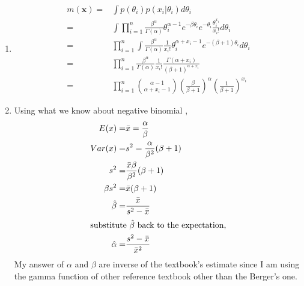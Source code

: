 \documentclass[11pt]{article}
\newcommand{\bnum}{\begin{enumerate}}
\newcommand{\enum}{\end{enumerate}}
\begin{document}
\item %
\bnum
\item %
\begin{align*}
m(\textbf{x}) =& \int p(\theta_i) p(x_i|\theta_i) d\theta_i \\
=& \int \prod_{i=1}^n \frac{\beta^\alpha}{\Gamma(\alpha)} \theta_i^{\alpha-1} e^{-\beta\theta_i} e^{-\theta_i} \frac{\theta_i^{x_i}}{x_i!} d\theta_i \\
=& \prod_{i=1}^n \int \frac{\beta^\alpha}{\Gamma(\alpha)} \frac{1}{x_i!} \theta_i^{\alpha+x_i-1} e^{-(\beta+1)\theta_i} d\theta_i \\
=& \prod_{i=1}^n \frac{\beta^\alpha}{\Gamma(\alpha)} \frac{1}{x_i!} \frac{\Gamma(\alpha+x_i)}{(\beta+1)^{\alpha+x_i}} \\
=& \prod_{i=1}^n {{\alpha-1}\choose{\alpha+x_i-1}}(\frac{\beta}{\beta+1})^\alpha (\frac{1}{\beta+1})^{x_i}
\end{align*}
\item %
 Using what we know about negative binomial ,
\begin{align*}
E(x) =& \bar{x} = \frac{\alpha}{\beta} \\
Var(x) =& s^2 =  \frac{\alpha}{\beta^2}(\beta+1)\\
s^2 =& \frac{\bar{x} \beta}{\beta^2}(\beta+1) \\
\beta s^2 =& \bar{x} (\beta +1) \\
\hat{\beta} =& \frac{\bar{x}}{s^2-\bar{x}}\\
\intertext{substitute $\hat{\beta}$ back to the expectation,}
\hat{\alpha} =& \frac{s^2 - \bar{x}}{\bar{x}^2} \\ 
\end{align*}
My answer of $\alpha$ and $\beta$ are inverse of the textbook's estimate since I am using the gamma function of other reference textbook other than the Berger's one.
\enum
\end{document}

